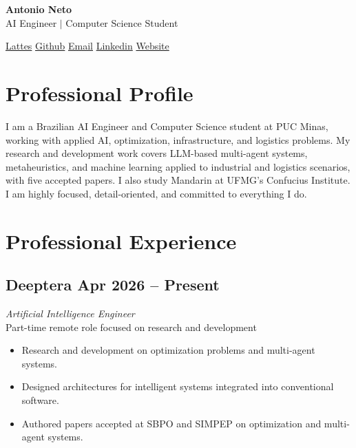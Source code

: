 \documentclass[a4paper,10pt]{article}
\begin{document}
\begin{center}
    \textbf{\Huge Antonio Neto} \\
    \vspace{2mm}
     AI Engineer $|$ Computer Science Student
\end{center}

\vspace{4mm}
\begin{center}
     \href{https://lattes.cnpq.br/6284651096866272}{Lattes} \hspace{1.5cm}
     \href{https://github.com/nietus}{Github} \hspace{1.5cm}
     \href{mailto:antonio@deeptera.com}{Email} \hspace{1.5cm}
     \href{https://www.linkedin.com/in/antonioniet/}{Linkedin} \hspace{1.5cm}
     \href{https://antonio.niet.com.br}{Website}
\end{center}

\space
\section*{ Professional Profile}
I am a Brazilian AI Engineer and Computer Science student at PUC Minas, working with applied AI, optimization, infrastructure, and logistics problems. My research and development work covers LLM-based multi-agent systems, metaheuristics, and machine learning applied to industrial and logistics scenarios, with five accepted papers. I also study Mandarin at UFMG's Confucius Institute. I am highly focused, detail-oriented, and committed to everything I do.

\section*{ Professional Experience}

\subsection*{Deeptera \hfill Apr 2026 -- Present}
\textit{Artificial Intelligence Engineer} \\
Part-time remote role focused on research and development
\begin{itemize}
    \item Research and development on optimization problems and multi-agent systems.
    \item Designed architectures for intelligent systems integrated into conventional software.
    \item Authored papers accepted at SBPO and SIMPEP on optimization and multi-agent systems.
\end{itemize}
\end{document}
